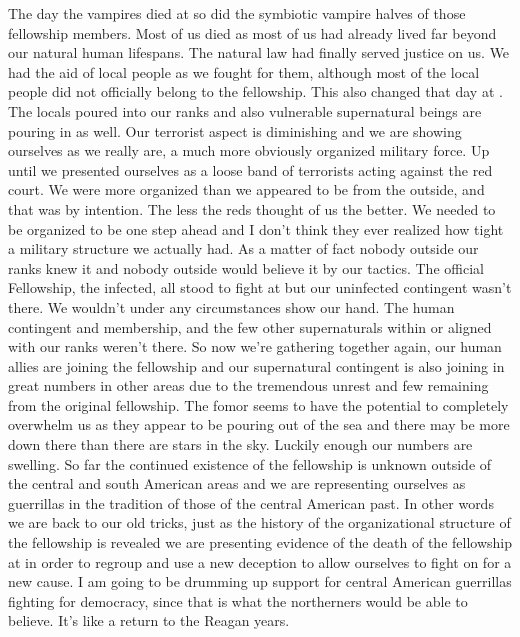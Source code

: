  The day the vampires died at \chichenitza* so did the symbiotic vampire halves of those fellowship members. Most of us died as most of us had already lived far beyond our natural human lifespans. The natural law had finally served justice on us. We had the aid of local people as we fought for them, although most of the local people did not officially belong to the fellowship. This also changed that day at \chichenitza*. The locals poured into our ranks and also vulnerable supernatural beings are pouring in as well. Our terrorist aspect is diminishing and we are showing ourselves as we really are, a much more obviously organized military force. Up until \chichenitza* we presented ourselves as a loose band of terrorists acting against the red court. We were more organized than we appeared to be from the outside, and that was by intention. The less the reds thought of us the better. We needed to be organized to be one step ahead and I don't think they ever realized how tight a military structure we actually had. As a matter of fact nobody outside our ranks knew it and nobody outside would believe it by our tactics. The official Fellowship, the infected, all stood to fight at \chichenitza* but our uninfected contingent wasn't there. We wouldn't under any circumstances show our hand. The human contingent and membership, and the few other supernaturals within or aligned with our ranks weren't there. So now we're gathering together again, our human allies are joining the fellowship and our supernatural contingent is also joining in great numbers in other areas due to the tremendous unrest and few remaining from the original fellowship. The fomor seems to have the potential to completely overwhelm us as they appear to be pouring out of the sea and there may be more down there than there are stars in the sky. Luckily enough our numbers are swelling. So far the continued existence of the fellowship is unknown outside of the central and south American areas and we are representing ourselves as guerrillas in the tradition of those of the central American past. In other words we are back to our old tricks, just as the history of the organizational structure of the fellowship is revealed we are presenting evidence of the death of the fellowship at \chichenitza* in order to regroup and use a new deception to allow ourselves to fight on for a new cause. I am going to be drumming up support for central American guerrillas fighting for democracy, since that is what the northerners would be able to believe. It's like a return to the Reagan years.
 
